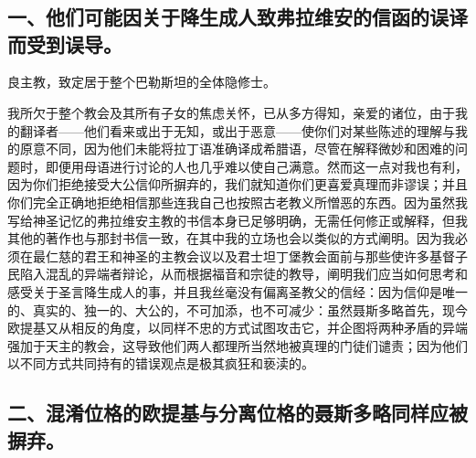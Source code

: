 
\section{}

\par


\subsection{一、他们可能因关于降生成人致弗拉维安的信函的误译而受到误导。}

良主教，致定居于整个巴勒斯坦的全体隐修士。\par

我所欠于整个教会及其所有子女的焦虑关怀，已从多方得知，亲爱的诸位，由于我的翻译者——他们看来或出于无知，或出于恶意——使你们对某些陈述的理解与我的原意不同，因为他们未能将拉丁语准确译成希腊语，尽管在解释微妙和困难的问题时，即便用母语进行讨论的人也几乎难以使自己满意。然而这一点对我也有利，因为你们拒绝接受大公信仰所摒弃的，我们就知道你们更喜爱真理而非谬误；并且你们完全正确地拒绝相信那些连我自己也按照古老教义所憎恶的东西。因为虽然我写给神圣记忆的弗拉维安主教的书信本身已足够明确，无需任何修正或解释，但我其他的著作也与那封书信一致，在其中我的立场也会以类似的方式阐明。因为我必须在最仁慈的君王和神圣的主教会议以及君士坦丁堡教会面前与那些使许多基督子民陷入混乱的异端者辩论，从而根据福音和宗徒的教导，阐明我们应当如何思考和感受关于圣言降生成人的事，并且我丝毫没有偏离圣教父的信经：因为信仰是唯一的、真实的、独一的、大公的，不可加添，也不可减少：虽然聂斯多略首先，现今欧提基又从相反的角度，以同样不忠的方式试图攻击它，并企图将两种矛盾的异端强加于天主的教会，这导致他们两人都理所当然地被真理的门徒们谴责；因为他们以不同方式共同持有的错误观点是极其疯狂和亵渎的。\par


\subsection{二、混淆位格的欧提基与分离位格的聂斯多略同样应被摒弃。}

